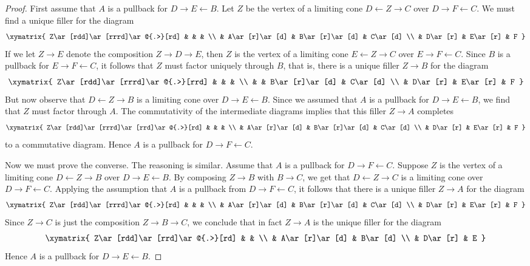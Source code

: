 \documentclass[12pt]{article}
\newcommand{\from}{\leftarrow}
\begin{document}
\begin{proof}

First assume that $A$ is a pullback for $D\to E\from B$.  Let $Z$ be
the vertex of a limiting cone $D\from Z\to C$ over $D\to F\from C$.
We must find a unique filler for the diagram
\[\xymatrix{
Z\ar[rdd]\ar[rrrd]\ar@{.>}[rd] &               &               &         \\
                               & A\ar[r]\ar[d] & B\ar[r]\ar[d] & C\ar[d] \\
                               & D\ar[r]       & E\ar[r]       & F
}\]
If we let $Z\to E$ denote the composition $Z\to D\to E$, then $Z$ is
the vertex of a limiting cone $E\from Z\to C$ over $E\to F\from C$.
Since $B$ is a pullback for $E\to F\from C$, it follows that $Z$ must
factor uniquely through $B$, that is, there is a unique filler $Z\to
B$ for the diagram
\[\xymatrix{
Z\ar[rdd]\ar[rrrd]\ar@{.>}[rrd] &               &               &         \\
                                &               & B\ar[r]\ar[d] & C\ar[d] \\
                                & D\ar[r]       & E\ar[r]       & F
}\]
But now observe that $D\from Z\to B$ is a limiting cone over $D\to
E\from B$.  Since we assumed that $A$ is a pullback for $D\to E\from
B$, we find that $Z$ must factor through $A$.  The commutativity of
the intermediate diagrams implies that this filler $Z\to A$ completes
\[\xymatrix{
Z\ar[rdd]\ar[rrrd]\ar[rrd]\ar@{.>}[rd] &               &               &         \\
                                       & A\ar[r]\ar[d] & B\ar[r]\ar[d] & C\ar[d] \\
                                       & D\ar[r]       & E\ar[r]       & F
}\]
to a commutative diagram.  Hence $A$ is a pullback for $D\to F\from C$.

Now we must prove the converse.  The reasoning is similar.  Assume
that $A$ is a pullback for $D\to F\from C$.  Suppose $Z$ is the vertex
of a limiting cone $D\from Z\to B$ over $D\to E\from B$.  By composing
$Z\to B$ with $B\to C$, we get that $D\from Z\to C$ is a limiting cone
over $D\to F\from C$.  Applying the assumption that $A$ is a pullback
from $D\to F\from C$, it follows that there is a unique filler $Z\to
A$ for the diagram
\[\xymatrix{
Z\ar[rdd]\ar[rrrd]\ar@{.>}[rd] &               &               &         \\
                               & A\ar[r]\ar[d] & B\ar[r]\ar[d] & C\ar[d] \\
                               & D\ar[r]       & E\ar[r]       & F
}\]
Since $Z\to C$ is just the composition $Z\to B\to C$, we conclude that in fact $Z\to A$ is the unique filler
for the diagram
\[\xymatrix{
Z\ar[rdd]\ar[rrd]\ar@{.>}[rd] &               &         \\
                              & A\ar[r]\ar[d] & B\ar[d] \\
                              & D\ar[r]       & E       
}\]
Hence $A$ is a pullback for $D\to E\from B$.
\end{proof}
\end{document}
